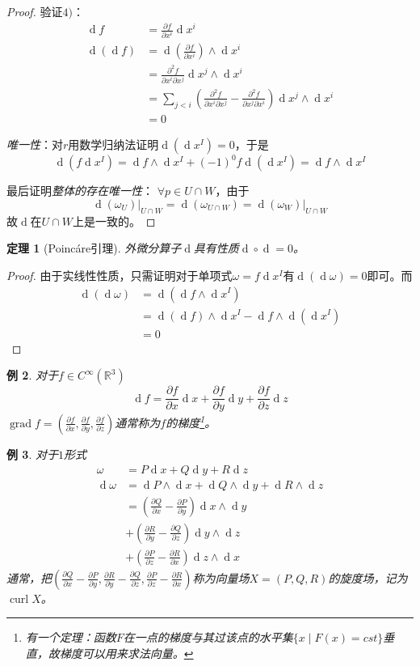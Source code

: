 \documentclass[winfonts,UTF8,c5size,a4paper,fancyhdr,hyperref,titlepage,nocap]{ctexart}
\newtheorem{thm}{定理}
\newtheorem{exa}[thm]{例}
\theoremstyle{definition}
\theoremstyle{remark}
\numberwithin{equation}{subsection}
\newcommand{\Real}{\mathbb{R}}
\newcommand{\red}{\color{red}}
\newcommand{\dd}{\operatorname{d}}
\newcommand{\pfrac}[2]{\frac{\partial{#1}}{\partial{#2}}}
\newcommand{\local}[2]{\left.{#1}\right|_{#2}}%
\newcommand{\grad}{\operatorname{grad}}%
\newcommand{\curl}{\operatorname{curl}}%
\begin{document}
\begin{proof}
验证$4)$：
\begin{align*}
\dd f&=\pfrac{f}{x^i}\dd x^i\\
\dd(\dd f)&=\dd(\pfrac{f}{x^i})\wedge\dd x^i\\
          &=\frac{\partial^2f}{\partial x^i\partial x^j}\dd x^j\wedge\dd x^i\\
          &=\sum_{j<i}(\frac{\partial^2f}{\partial x^i\partial x^j}-\frac{\partial^2f}{\partial x^j\partial x^i})\dd x^j\wedge\dd x^i\\
          &=0
\end{align*}

\emph{唯一性}：对$r$用数学归纳法证明$\dd(\dd x^I)=0$，于是
\begin{equation*}
\dd(f\dd x^I)=\dd f\wedge\dd x^I+(-1)^{0}f\dd(\dd x^I)=\dd f\wedge\dd x^I
\end{equation*}

最后证明\emph{整体的存在唯一性}：
$\forall p\in U\cap W$，由于
\begin{equation*}
\local{\dd(\omega_U)}{U\cap W}=\dd(\omega_{U\cap W})=\local{\dd(\omega_W)}{U\cap W}
\end{equation*}
故$\dd$在$U\cap W$上是一致的。
\end{proof}
\begin{thm}[Poinc\'{a}re引理]
  外微分算子$\dd$具有性质$\dd\circ\dd=0$。
\end{thm}
\begin{proof}
  由于实线性性质，只需证明对于单项式$\omega=f\dd x^I$有$\dd(\dd\omega)=0$即可。而
\begin{align*}
 \dd(\dd\omega)&=\dd(\dd f\wedge\dd x^I)\\
              &=\dd(\dd f)\wedge\dd x^I-\dd f\wedge\dd(\dd x^I)\\
              &=0
\end{align*}
\end{proof}
\begin{exa}
  对于$f\in C^{\infty}(\Real^3)$
\begin{equation*}
\dd f=\pfrac{f}{x}\dd x+\pfrac{f}{y}\dd y+\pfrac{f}{z}\dd z
\end{equation*}
$\grad f=(\pfrac{f}{x},\pfrac{f}{y},\pfrac{f}{z})$通常称为$f$的{\red 梯度}\footnote{有一个定理：函数$F$在一点的梯度与其过该点的\emph{\red 水平集}$\{x\mid F(x)=cst\}$垂直，故梯度可以用来求法向量。}。
\end{exa}
\begin{exa}
  对于$1$形式
\begin{align*}
\omega&=P\dd x+Q\dd y+R\dd z\\
\dd\omega&=\dd P\wedge\dd x+\dd Q\wedge\dd y+\dd R\wedge\dd z\\
         &=(\pfrac{Q}{x}-\pfrac{P}{y})\dd x\wedge\dd y\\
         &+(\pfrac{R}{y}-\pfrac{Q}{z})\dd y\wedge\dd z\\
         &+(\pfrac{P}{z}-\pfrac{R}{x})\dd z\wedge\dd x
\end{align*}
通常，把$(\pfrac{Q}{x}-\pfrac{P}{y},\pfrac{R}{y}-\pfrac{Q}{z},\pfrac{P}{z}-\pfrac{R}{x})$称为向量场$X=(P,Q,R)$的{\red 旋度场}，记为$\curl X$。
\end{exa}
\end{document}
